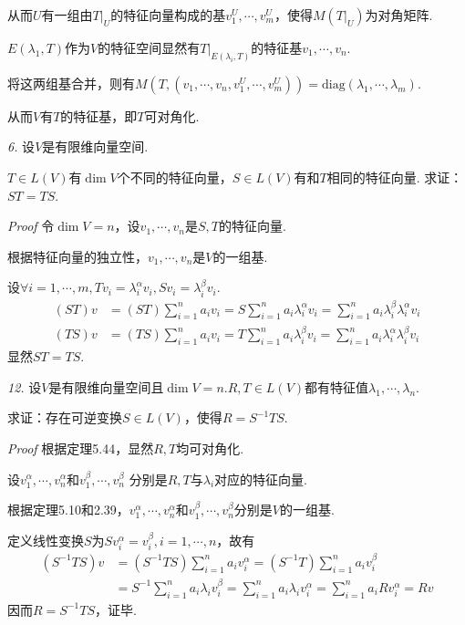 从而\(U\)有一组由\(T|_U\)的特征向量构成的基\(v_1^U,\cdots,v_m^U\)，使得\(M(T|_U)\)为对角矩阵.

\(E(\lambda_1,T)\)作为\(V\)的特征空间显然有\(T|_{E(\lambda_i,T)}\)的特征基\(v_1,\cdots,v_n\).

将这两组基合并，则有\(M(T,(v_1,\cdots,v_n,v_1^U,\cdots,v_m^U))=\mathrm{diag}(\lambda_1,\cdots,\lambda_m)\).

从而\(V\)有\(T\)的特征基，即\(T\)可对角化.

\newpage

\textit{6.}
设\(V\)是有限维向量空间.

\(T \in L(V)\)有\(\dim V\)个不同的特征向量，\(S \in L(V)\)有和\(T\)相同的特征向量.
求证：\(ST=TS\).

\textit{Proof}
令\(\dim V=n\)，设\(v_1,\cdots,v_n\)是\(S,T\)的特征向量.

根据特征向量的独立性，\(v_1,\cdots,v_n\)是\(V\)的一组基.

设\(\forall i=1,\cdots,m,Tv_i=\lambda_i^\alpha v_i,Sv_i=\lambda_i^\beta v_i\).
    \begin{align*}
        (ST)v &=(ST)\sum_{i=1}^n a_iv_i=S\sum_{i=1}^n a_i \lambda_i^\alpha v_i
                =\sum_{i=1}^n a_i \lambda_i^\beta \lambda_i^\alpha v_i \\
        (TS)v &=(TS)\sum_{i=1}^n a_iv_i=T\sum_{i=1}^n a_i \lambda_i^\beta v_i
                =\sum_{i=1}^n a_i \lambda_i^\alpha \lambda_i^\beta v_i
    \end{align*}
显然\(ST=TS\).

\hspace*{\fill}

\textit{12.}
设\(V\)是有限维向量空间且\(\dim V=n\).\(R,T \in L(V)\)都有特征值\(\lambda_1,\cdots,\lambda_n\).

求证：存在可逆变换\(S \in L(V)\)，使得\(R=S^{-1}TS\).

\textit{Proof}
根据定理5.44，显然\(R,T\)均可对角化.

设\(v_1^\alpha,\cdots,v_n^\alpha\)和\(v_1^\beta,\cdots,v_n^\beta\)
分别是\(R,T\)与\(\lambda_i\)对应的特征向量.

根据定理5.10和2.39，\(v_1^\alpha,\cdots,v_n^\alpha\)和\(v_1^\beta,\cdots,v_n^\beta\)分别是\(V\)的一组基.

定义线性变换\(S\)为\(Sv_i^\alpha=v_i^\beta,i=1,\cdots,n\)，故有
    \begin{align*}
        (S^{-1}TS)v &=(S^{-1}TS)\sum_{i=1}^n a_iv_i^\alpha=(S^{-1}T)\sum_{i=1}^n a_iv_i^\beta \\
                    &=S^{-1}\sum_{i=1}^n a_i\lambda_i v_i^\beta=\sum_{i=1}^n a_i\lambda_i v_i^\alpha
                     =\sum_{i=1}^n a_iRv_i^\alpha=Rv
    \end{align*}
因而\(R=S^{-1}TS\)，证毕.

